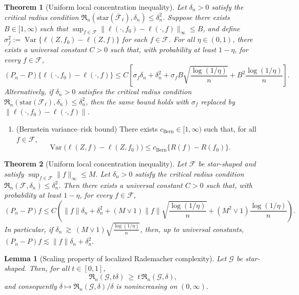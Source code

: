 \documentclass[10pt,a4paper]{amsart}
\newtheorem{theorem}{Theorem}
\newtheorem{lemma}{Lemma}
\newcommand{\Var}{\operatorname{Var}}
\begin{document}
\begin{theorem}[Uniform local concentration inequality]
\label{theorem::localmaxloss}
Let $\delta_n>0$ satisfy the critical radius condition
$\mathfrak{R}_n(\mathrm{star}(\overline{\mathcal{F}}_{\ell}),\delta_n)\le \delta_n^2$.
Suppose there exists \(B \in [1,\infty)\) such that
\(\sup_{f \in \mathcal F}\|\ell(\cdot,f_0)-\ell(\cdot,f)\|_{\infty} \le B\),
and define \(\sigma_f^2 := \Var\{\ell(Z,f_0)-\ell(Z,f)\}\) for each
\(f \in \mathcal F\).
For all $\eta \in (0,1)$, there exists a universal constant $C>0$ such that, with probability at least $1-\eta$, for every $f\in\mathcal{F}$,
\[
(P_n-P) \{\ell(\cdot, f_0) - \ell(\cdot, f)\}
\le
C\left[
\sigma_f\delta_n
+
\delta_n^2
+
\sigma_f B  \sqrt{\frac{\log(1/\eta)}{n}}
+
B^2\frac{\log(1/\eta)}{n}
\right].
\]
Alternatively, if $\delta_n>0$ satisfies the critical radius condition
$\mathfrak{R}_n(\mathrm{star}(\mathcal{F}_{\ell}),\delta_n)\le \delta_n^2$, then the same bound holds with
$\sigma_f$ replaced by $\|\ell(\cdot, f_0) - \ell(\cdot, f)\|$.
\end{theorem}

\begin{enumerate}[label=\bf{A\arabic*)}, ref={A\arabic*}, series = main]
  \item \label{cond::bernstein} (Bernstein variance--risk bound) There exists $c_{\mathrm{Bern}} \in [1,\infty)$ such that, for all $f\in\mathcal F$,
\begin{equation*}
\Var\bigl(\ell(Z,f)-\ell(Z,f_0)\bigr)\le c_{\mathrm{Bern}}\{R(f)-R(f_0)\}.
\end{equation*}
\end{enumerate}

\begin{theorem}[Uniform local concentration inequality]\label{theorem:loc_max_ineq}
Let $\mathcal{F}$ be star-shaped and satisfy $\sup_{f\in\mathcal{F}}\|f\|_\infty\le M$.
Let $\delta_n>0$ satisfy the critical radius condition
$\mathfrak{R}_n(\mathcal{F},\delta_n)\le \delta_n^2$.
Then there exists a universal constant $C>0$ such that, with probability at least $1-\eta$, for every $f\in\mathcal{F}$,
\[
(P_n-P)f
\leq
C \left( \|f\|\delta_n
+
\delta_n^2
+
(M \vee 1) \|f\| \sqrt{\frac{\log(1/\eta)}{n}}
+
(M^2 \vee 1)\frac{\log(1/\eta)}{n} \right).
\]
In particular, if $\delta_n \ \gtrsim\ (M \vee 1)\sqrt{\frac{\log(1/\eta)}{n}}$, then, up to universal constants, $(P_n-P)f
\lesssim
\|f\|\delta_n
+
\delta_n^2.$
\end{theorem}

\begin{lemma}[Scaling property of localized Rademacher complexity]\label{lem:rad_scaling}
Let \(\mathcal{G}\) be star-shaped. Then, for all \(t\in[0,1]\),
\[
\mathfrak{R}_n(\mathcal{G},t\delta)\ \ge\ t\,\mathfrak{R}_n(\mathcal{G},\delta),
\]
and consequently \(\delta \mapsto \mathfrak{R}_n(\mathcal{G},\delta)/\delta\)
is nonincreasing on \((0,\infty)\).
\end{lemma}
\end{document}
